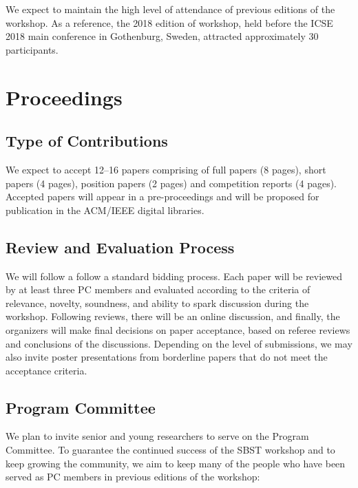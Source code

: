 \documentclass[sigconf,review]{acmart}
\begin{document}
We expect to maintain the high level of attendance of previous
editions of the workshop. As a reference, the 2018 edition of
workshop, held before the ICSE 2018 main conference in Gothenburg,
Sweden, attracted approximately 30 participants.

\section{Proceedings}

\subsection{Type of Contributions}

We expect to accept 12--16 papers comprising of full papers (8 pages),
short papers (4 pages), position papers (2 pages) and competition
reports (4 pages).  Accepted papers will appear in a pre-proceedings
and will be proposed for publication in the ACM/IEEE digital
libraries.

\subsection{Review and Evaluation Process}

We will follow a follow a standard bidding process. Each paper will be
reviewed by at least three PC members and evaluated according to the
criteria of relevance, novelty, soundness, and ability to spark
discussion during the workshop. Following reviews, there will be an
online discussion, and finally, the organizers will make final
decisions on paper acceptance, based on referee reviews and
conclusions of the discussions. Depending on the level of submissions,
we may also invite poster presentations from borderline papers that do
not meet the acceptance criteria.


\subsection{Program Committee}

We plan to invite senior and young researchers to serve on the Program
Committee. To guarantee the continued success of the SBST workshop and
to keep growing the community, we aim to keep many of the people who
have been served as PC members in previous editions of the workshop:
\end{document}
